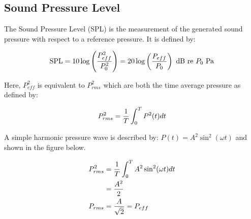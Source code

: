     \subsection{Sound Pressure Level}
    The Sound Pressure Level (SPL) is the measurement of the generated sound pressure with respect to a reference pressure.
    It is defined by:

    \begin{equation} \labeq{spl}
        \text{SPL} = 10\log \left(\frac{P_{eff}^2}{P_0^2}\right) = 20\log \left(\frac{P_{eff}}{P_0}\right) \text{ dB re $P_0$ Pa}
    \end{equation}


    Here, $P_{eff}^2$ is equivalent to $P_{rms}^2$ which are both the time average pressure as defined by:
    
    \begin{equation*} \labeq{p_rms}
        P_{rms}^2 = \frac{1}{T} \int_{0}^{T}P^2(t)dt
    \end{equation*}

    \begin{example}
        A simple harmonic pressure wave is described by: $P(t) = A^2 \sin^2(\omega t)$ and shown in the figure below.

        \begin{center}
        \end{center}

        \begin{align}
            P_{rms}^2   &= \frac{1}{T} \int_{0}^{T} A^2 \sin^2(\omega t) dt \notag \\
                        &= \frac{A^2}{2} \notag \\
            P_{rms}     &= \frac{A}{\sqrt{2}} = P_{eff} \notag
        \end{align}
    \end{example}


